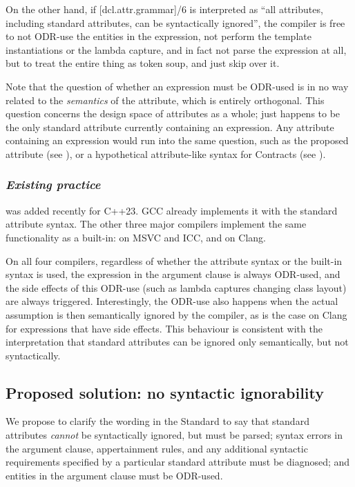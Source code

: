 On the other hand, if [dcl.attr.grammar]/6 is interpreted as ``all attributes, including standard attributes, can be syntactically ignored'', the compiler is free to not ODR-use the entities in the expression, not perform the template instantiations or the lambda capture, and in fact not parse the expression at all, but to treat the entire thing as token soup, and just skip over it.

Note that the question of whether an expression must be ODR-used is in no way related to the \emph{semantics} of the  attribute, which is entirely orthogonal. This question concerns the design space of attributes as a whole;  just happens to be the only standard attribute currently containing an expression. Any attribute containing an expression would run into the same question, such as the proposed  attribute (see \cite{P1144R5}), or a hypothetical attribute-like syntax for Contracts (see \cite{P2487R0}).

\subsubsection*{\emph{Existing practice}}

 was added recently for C++23. GCC already implements it with the standard attribute syntax. The other three major compilers implement the same functionality as a built-in:  on MSVC and ICC, and \mbox{} on Clang.

On all four compilers, regardless of whether the attribute syntax or the built-in syntax is used, the expression in the argument clause is always ODR-used, and the side effects of this ODR-use (such as lambda captures changing class layout) are always triggered. Interestingly, the ODR-use also happens when the actual assumption is then semantically ignored by the compiler, as is the case on Clang for expressions that have side effects. This behaviour is consistent with the interpretation that standard attributes can be ignored only semantically, but not syntactically.

\subsection{Proposed solution: no syntactic ignorability}
\label{subsec:proposal_syntactic}

We propose to clarify the wording in the Standard to say that standard attributes \emph{cannot} be syntactically ignored, but must be parsed; syntax errors in the argument clause, appertainment rules, and any additional syntactic requirements specified by a particular standard attribute must be diagnosed; and entities in the argument clause must be ODR-used.

